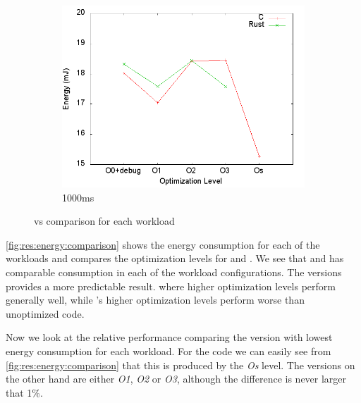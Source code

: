 \begin{figure}[H]
  \begin{subfigure}{0.49\textwidth}
    \includegraphics[width=\textwidth]{results/plots/energy/1000.png}
    \caption{1000ms}
    \label{}
  \end{subfigure}

  \caption{{\rust} vs {\C} comparison for each workload}
  \label{fig:res:energy:comparison}
\end{figure}

\autoref{fig:res:energy:comparison} shows the energy consumption for each of the workloads and compares the optimization levels for {\rust} and {\C}.
We see that {\rust} and {\C} has comparable consumption in each of the workload configurations.
The {\rust} versions provides a more predictable result. where higher optimization levels perform generally well, while {\C}'s higher optimization levels perform worse than unoptimized code.

Now we look at the relative performance comparing the version with lowest energy consumption for each workload.
For the {\C} code we can easily see from \autoref{fig:res:energy:comparison} that this is produced by the \emph{Os} level.
The {\rust} versions on the other hand are either \emph{O1}, \emph{O2} or \emph{O3}, although the difference is never larger that 1\%.

